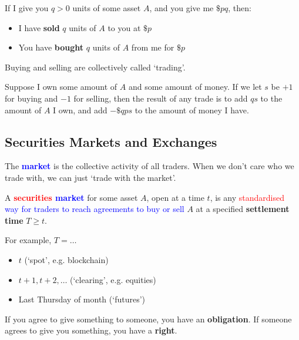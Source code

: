 \documentclass{article}
\begin{document}
If I give you $q>0$ units of some asset $A$, and you give me $\$pq$, then:%
\begin{itemize}
	\item I have \textbf{sold} $q$ units of $A$ to you at $\$p$
	\item You have \textbf{bought} $q$ units of $A$ from me for $\$p$
\end{itemize} %

Buying and selling are collectively called `trading'.%

Suppose I own some amount of $A$ and some amount of money. If we let $s$ be $+1$ for buying and $-1$ for selling, then the result of any trade is to add $qs$ to the amount of $A$ I own, and add $-\$qps$ to the amount of money I have. %

\subsection{Securities Markets and Exchanges}
The \textbf{\textcolor{blue}{market}} is the collective activity of all traders. When we don't care who we trade with, we can just `trade with the market'.

A \textbf{\textcolor{red}{securities} \textcolor{blue}{market}} for some asset $A$, open at a time $t$, is any \textcolor{red}{standardised} \textcolor{blue}{way for traders to reach agreements to buy or sell} $A$ at a specified \textbf{settlement time} $T\geq t$. %

For example, $T=\ldots$
\begin{itemize}
	\item $t$ (`spot', e.g. blockchain) %
	\item $t+1, t+2, \ldots$ (`clearing', e.g. equities)
	\item Last Thursday of month (`futures')
\end{itemize}

If you agree to give something to someone, you have an \textbf{obligation}. If someone agrees to give you something, you have a \textbf{right}.
\end{document}
